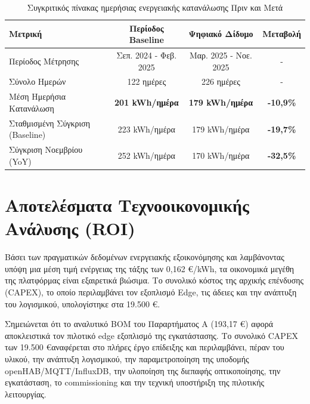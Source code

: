 \begin{table}[htbp]
\centering
\caption{Συγκριτικός πίνακας ημερήσιας ενεργειακής κατανάλωσης Πριν και Μετά}
\label{tab:energy_comparison}
\begin{tabular}{|l|c|c|c|}
\hline
\textbf{Μετρική} & \textbf{Περίοδος Baseline} & \textbf{Ψηφιακό Δίδυμο} & \textbf{Μεταβολή} \\
\hline
Περίοδος Μέτρησης & Σεπ. 2024 - Φεβ. 2025 & Μαρ. 2025 - Νοε. 2025 & - \\
\hline
Σύνολο Ημερών & 122 ημέρες & 226 ημέρες & - \\
\hline
Μέση Ημερήσια Κατανάλωση & \textbf{201 \textlatin{kWh}/ημέρα} & \textbf{179 \textlatin{kWh}/ημέρα} & \textbf{-10,9\%} \\
\hline
Σταθμισμένη Σύγκριση (Baseline) & 223 \textlatin{kWh}/ημέρα & 179 \textlatin{kWh}/ημέρα & \textbf{-19,7\%} \\
\hline
Σύγκριση Νοεμβρίου (\textlatin{YoY}) & 252 \textlatin{kWh}/ημέρα & 170 \textlatin{kWh}/ημέρα & \textbf{-32,5\%} \\
\hline
\end{tabular}
\end{table}

\section{Αποτελέσματα Τεχνοοικονομικής Ανάλυσης (ROI)}
Βάσει των πραγματικών δεδομένων ενεργειακής εξοικονόμησης και λαμβάνοντας υπόψη μια μέση τιμή ενέργειας της τάξης των 0,162 \euro/\textlatin{kWh}, τα οικονομικά μεγέθη της πλατφόρμας είναι εξαιρετικά βιώσιμα. Το συνολικό κόστος της αρχικής επένδυσης (\textlatin{CAPEX}), το οποίο περιλαμβάνει τον εξοπλισμό \textlatin{Edge}, τις άδειες και την ανάπτυξη του λογισμικού, υπολογίστηκε στα 19.500 \euro.

Σημειώνεται ότι το αναλυτικό \textlatin{BOM} του Παραρτήματος Α (193,17 \euro) αφορά αποκλειστικά τον πιλοτικό \textlatin{edge} εξοπλισμό της εγκατάστασης. Το συνολικό \textlatin{CAPEX} των 19.500 \euro αναφέρεται στο πλήρες έργο επίδειξης και περιλαμβάνει, πέραν του υλικού, την ανάπτυξη λογισμικού, την παραμετροποίηση της υποδομής \textlatin{openHAB}/\textlatin{MQTT}/\textlatin{InfluxDB}, την υλοποίηση της διεπαφής οπτικοποίησης, την εγκατάσταση, το \textlatin{commissioning} και την τεχνική υποστήριξη της πιλοτικής λειτουργίας.

